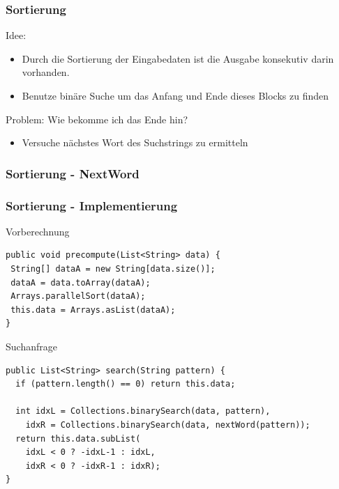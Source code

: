 \documentclass[11pt, xcolor=dvipsnames]{beamer}
\begin{document}
	\begin{frame}
	\frametitle{Sortierung}
	Idee:
	\begin{itemize}
		\item Durch die Sortierung der Eingabedaten ist die Ausgabe konsekutiv darin vorhanden. 
		\item Benutze binäre Suche um das Anfang und Ende dieses Blocks zu finden
	\end{itemize}
	Problem: Wie bekomme ich das Ende hin?
	\begin{itemize}
		\item Versuche nächstes Wort des Suchstrings zu ermitteln
	\end{itemize}	
	\end{frame}
		
\begin{frame}[fragile]
	\frametitle{Sortierung - NextWord}
\end{frame}
	
\begin{frame}[fragile]
	\frametitle{Sortierung - Implementierung}
	Vorberechnung
	\begin{lstlisting}
public void precompute(List<String> data) {
 String[] dataA = new String[data.size()];
 dataA = data.toArray(dataA);
 Arrays.parallelSort(dataA);
 this.data = Arrays.asList(dataA);		
}	
	\end{lstlisting}
	Suchanfrage
	\begin{lstlisting}
public List<String> search(String pattern) {
  if (pattern.length() == 0) return this.data;
	
  int idxL = Collections.binarySearch(data, pattern),
    idxR = Collections.binarySearch(data, nextWord(pattern));
  return this.data.subList(
	idxL < 0 ? -idxL-1 : idxL, 
	idxR < 0 ? -idxR-1 : idxR);
}
	\end{lstlisting}
\end{frame}
\end{document}
